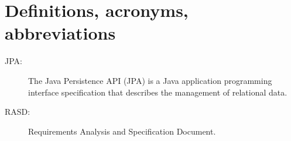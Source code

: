 \section{Definitions, acronyms, abbreviations}
\begin{description}
    \item[JPA:] The Java Persistence API (JPA) is a Java application programming interface specification that describes the management of relational data.
    \item[RASD:] Requirements Analysis and Specification Document.
\end{description}
